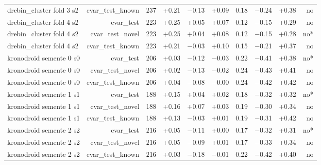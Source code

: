 \begin{table}[t]
\begin{tabular}{lrrrrrrrrr}
drebin\_cluster fold 3 s2 & cvar\_test\_known & 237 & +0.21 & $-$0.13 & +0.09 & 0.18 & $-$0.24 & +0.38 & no \\
drebin\_cluster fold 4 s2 & cvar\_test & 223 & +0.25 & +0.05 & +0.07 & 0.12 & $-$0.15 & +0.29 & no \\
drebin\_cluster fold 4 s2 & cvar\_test\_novel & 223 & +0.25 & +0.04 & +0.08 & 0.12 & $-$0.15 & +0.28 & no* \\
drebin\_cluster fold 4 s2 & cvar\_test\_known & 223 & +0.21 & $-$0.03 & +0.10 & 0.15 & $-$0.21 & +0.37 & no \\
kronodroid semente 0 s0 & cvar\_test & 206 & +0.03 & $-$0.12 & $-$0.03 & 0.22 & $-$0.41 & +0.38 & no* \\
kronodroid semente 0 s0 & cvar\_test\_novel & 206 & +0.02 & $-$0.13 & $-$0.02 & 0.24 & $-$0.43 & +0.41 & no \\
kronodroid semente 0 s0 & cvar\_test\_known & 206 & +0.04 & $-$0.08 & $-$0.00 & 0.24 & $-$0.42 & +0.42 & no \\
kronodroid semente 1 s1 & cvar\_test & 188 & +0.15 & +0.04 & +0.02 & 0.18 & $-$0.32 & +0.32 & no* \\
kronodroid semente 1 s1 & cvar\_test\_novel & 188 & +0.16 & +0.07 & +0.03 & 0.19 & $-$0.30 & +0.34 & no \\
kronodroid semente 1 s1 & cvar\_test\_known & 188 & +0.13 & $-$0.03 & +0.01 & 0.19 & $-$0.31 & +0.42 & no \\
kronodroid semente 2 s2 & cvar\_test & 216 & +0.05 & $-$0.11 & +0.00 & 0.17 & $-$0.32 & +0.31 & no* \\
kronodroid semente 2 s2 & cvar\_test\_novel & 216 & +0.05 & $-$0.09 & +0.01 & 0.17 & $-$0.33 & +0.34 & no \\
kronodroid semente 2 s2 & cvar\_test\_known & 216 & +0.03 & $-$0.18 & $-$0.01 & 0.22 & $-$0.42 & +0.40 & no \\
\bottomrule
\end{tabular}
\end{table}
